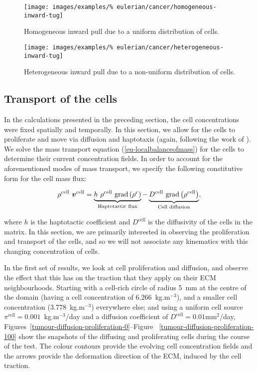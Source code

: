 \begin{figure}[!hptb]
\centering
\texttt{[image: images/examples/\%
eulerian/cancer/homogeneous-inward-tug]}
\caption{Homogeneous inward pull due to a uniform distribution of
  cells.}
\label{tumour-homogeneous-inward-tug}
\end{figure}

\begin{figure}[!hptb]
\centering
\texttt{[image: images/examples/\%
eulerian/cancer/heterogeneous-inward-tug]}
\caption{Heterogeneous inward pull due to a non-uniform distribution
  of cells.}
\label{tumour-heterogeneous-inward-tug}
\end{figure}

\clearpage

\subsection{Transport of the cells}
\label{cell-transport}

In the calculations presented in the preceding section, the cell
concentrations were fixed spatially and temporally. In this section,
we allow for the cells to proliferate and move via diffusion and
haptotaxis (again, following the work of \citet{namyetal:04}). We
solve the mass transport equation (\ref{eu-localbalanceofmass}) for
the cells to determine their current concentration
fields. In order to account for the aforementioned modes of mass
transport, we specify the following constitutive form for the cell
mass flux:

\begin{equation}
\rho^{\mathrm{cell}}\ \bv^{\mathrm{cell}} = \underbrace{h\ \rho^{\mathrm{cell}}\
\mathrm{grad}\left(\rho^{\mathrm{c}}\right)}_{\text{Haptotactic flux}}
-\underbrace{D^{\mathrm{cell}}\ \mathrm{grad}\left(\rho^{\mathrm{cell}}\right)
}_{\text{Cell diffusion}},
\end{equation}

\noindent where $h$ is the haptotactic coefficient and
$D^{\mathrm{cell}}$ is the diffusivity of the cells in the matrix. In
this section, we are primarily interested in observing the
proliferation and transport of the cells, and so we will not associate
any kinematics with this changing concentration of cells.

In the first set of results, we look at cell proliferation and
diffusion, and observe the effect that this has on the traction that
they apply on their ECM neighbourhoods. Starting with a cell-rich
circle of radius 5~mm at the centre of the domain (having a cell
concentration of 6.266~kg.m$^{-3}$), and a smaller cell concentration
(3.778~kg.m$^{-3}$) everywhere else; and using a uniform cell source
$\pi^{\mathrm{cell}}=0.001$~kg.m$^{-3}$/day and a diffusion
coefficient of $D^{\mathrm{cell}}=0.01$mm$^2$/day,
Figures~\ref{tumour-diffusion-proliferation-0}--Figure~%
\ref{tumour-diffusion-proliferation-100} show the snapshots of the
diffusing and proliferating cells during the course of the test. The colour
contours provide the evolving cell concentration fields and the arrows
provide the deformation direction of the ECM, induced by the cell
traction.

